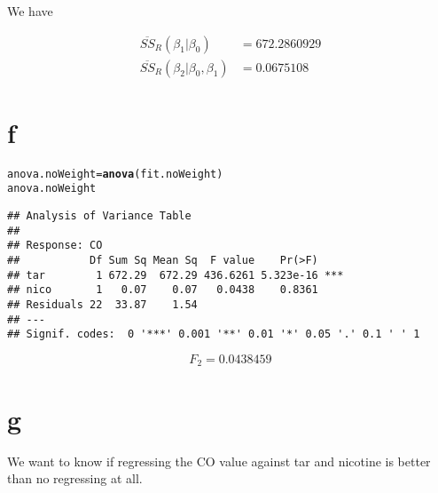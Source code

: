 \documentclass{article}\usepackage[]{graphicx}\usepackage[]{color}
\makeatletter
\newcommand{\hlstd}[1]{\textcolor[rgb]{0.345,0.345,0.345}{#1}}%
\newcommand{\hlkwb}[1]{\textcolor[rgb]{0.69,0.353,0.396}{#1}}%
\newcommand{\hlkwd}[1]{\textcolor[rgb]{0.737,0.353,0.396}{\textbf{#1}}}%
\newenvironment{kframe}{%
 \def\at@end@of@kframe{}%
 \ifinner\ifhmode%
  \def\at@end@of@kframe{\end{minipage}}%
  \begin{minipage}{\columnwidth}%
 \fi\fi%
 \def\FrameCommand##1{\hskip\@totalleftmargin \hskip-\fboxsep
 \colorbox{shadecolor}{##1}\hskip-\fboxsep
     \hskip-\linewidth \hskip-\@totalleftmargin \hskip\columnwidth}%
 \MakeFramed {\advance\hsize-\width
   \@totalleftmargin\z@ \linewidth\hsize
   \@setminipage}}%
 {\par\unskip\endMakeFramed%
 \at@end@of@kframe}
\newenvironment{knitrout}{}{} %
\makeatother
\begin{document}
We have 

\begin{align}
\overline{SS}_R (\beta_1 \vert \beta_0) &= 672.2860929\\
\overline{SS}_R (\beta_2 \vert \beta_0, \beta_1) &= 0.0675108
\end{align}

\section*{f}

\begin{knitrout}
\color{fgcolor}\begin{kframe}
\begin{alltt}
\hlstd{anova.noWeight} \hlkwb{=} \hlkwd{anova}\hlstd{(fit.noWeight)}
\hlstd{anova.noWeight}
\end{alltt}
\begin{verbatim}
## Analysis of Variance Table
## 
## Response: CO
##           Df Sum Sq Mean Sq  F value    Pr(>F)    
## tar        1 672.29  672.29 436.6261 5.323e-16 ***
## nico       1   0.07    0.07   0.0438    0.8361    
## Residuals 22  33.87    1.54                       
## ---
## Signif. codes:  0 '***' 0.001 '**' 0.01 '*' 0.05 '.' 0.1 ' ' 1
\end{verbatim}
\end{kframe}
\end{knitrout}

\begin{equation}
F_2 = 0.0438459
\end{equation}

\clearpage

\section*{g}

We want to know if regressing the CO value against tar and nicotine is better than no regressing at all. 
\end{document}
